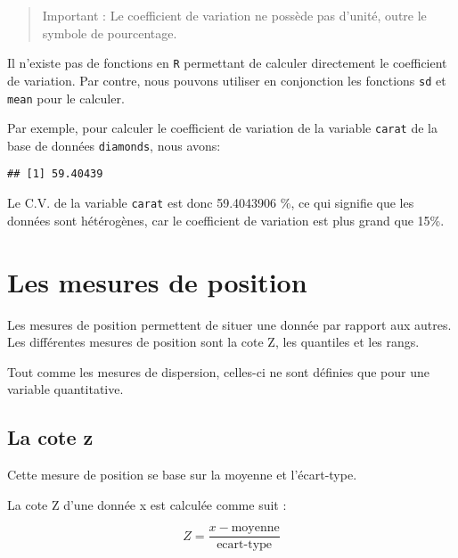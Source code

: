 \documentclass[]{book}
\newenvironment{Shaded}{\begin{snugshade}}{\end{snugshade}}
\newcommand{\KeywordTok}[1]{\textcolor[rgb]{0.13,0.29,0.53}{\textbf{#1}}}
\newcommand{\DecValTok}[1]{\textcolor[rgb]{0.00,0.00,0.81}{#1}}
\newcommand{\OperatorTok}[1]{\textcolor[rgb]{0.81,0.36,0.00}{\textbf{#1}}}
\newcommand{\NormalTok}[1]{#1}
\begin{document}
\begin{quote}
Important : Le coefficient de variation ne possède pas d'unité, outre le
symbole de pourcentage.
\end{quote}

Il n'existe pas de fonctions en \texttt{R} permettant de calculer
directement le coefficient de variation. Par contre, nous pouvons
utiliser en conjonction les fonctions \texttt{sd} et \texttt{mean} pour
le calculer.

Par exemple, pour calculer le coefficient de variation de la variable
\texttt{carat} de la base de données \texttt{diamonds}, nous avons:

\begin{Shaded}
\end{Shaded}

\begin{verbatim}
## [1] 59.40439
\end{verbatim}

Le C.V. de la variable \texttt{carat} est donc 59.4043906 \%, ce qui
signifie que les données sont hétérogènes, car le coefficient de
variation est plus grand que 15\%.

\section{Les mesures de position}\label{les-mesures-de-position}

Les mesures de position permettent de situer une donnée par rapport aux
autres. Les différentes mesures de position sont la cote Z, les
quantiles et les rangs.

Tout comme les mesures de dispersion, celles-ci ne sont définies que
pour une variable quantitative.

\subsection{La cote z}\label{la-cote-z}

Cette mesure de position se base sur la moyenne et l'écart-type.

La cote Z d'une donnée x est calculée comme suit :

\begin{equation}
Z = \dfrac{x-\text{moyenne}}{\text{ecart-type}}
\end{equation}
\end{document}
